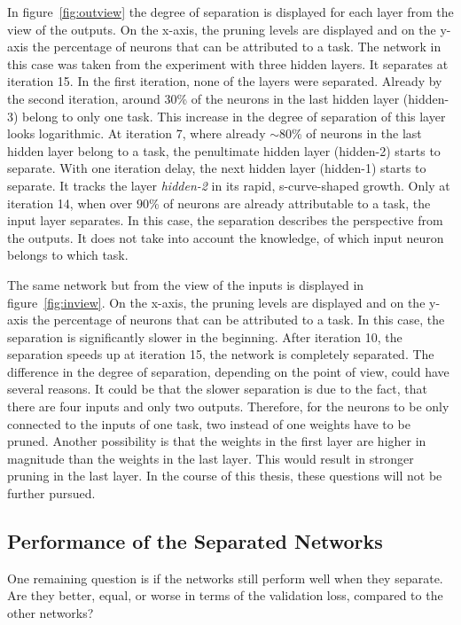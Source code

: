 In figure~\ref{fig:outview} the degree of separation is displayed for each layer from the view of the outputs.
On the x-axis, the pruning levels are displayed and on the y-axis the percentage of neurons that can be attributed to a task.
The network in this case was taken from the experiment with three hidden layers.
It separates at iteration 15.
In the first iteration, none of the layers were separated.
Already by the second iteration, around $30$\% of the neurons in the last hidden layer (hidden-3) belong to only one task.
This increase in the degree of separation of this layer looks logarithmic.
At iteration 7, where already $\sim80$\% of neurons in the last hidden layer belong to a task, the penultimate hidden layer (hidden-2) starts to separate.
With one iteration delay, the next hidden layer (hidden-1) starts to separate.
It tracks the layer \textit{hidden-2} in its rapid, s-curve-shaped growth.
Only at iteration 14, when over $90$\% of neurons are already attributable to a task, the input layer separates.
In this case, the separation describes the perspective from the outputs.
It does not take into account the knowledge, of which input neuron belongs to which task.

The same network but from the view of the inputs is displayed in figure~\ref{fig:inview}.
On the x-axis, the pruning levels are displayed and on the y-axis the percentage of neurons that can be attributed to a task.
In this case, the separation is significantly slower in the beginning.
After iteration 10, the separation speeds up at iteration 15, the network is completely separated.
The difference in the degree of separation, depending on the point of view, could have several reasons.
It could be that the slower separation is due to the fact, that there are four inputs and only two outputs.
Therefore, for the neurons to be only connected to the inputs of one task, two instead of one weights have to be pruned.
Another possibility is that the weights in the first layer are higher in magnitude than the weights in the last layer.
This would result in stronger pruning in the last layer.
In the course of this thesis, these questions will not be further pursued.

\subsection{Performance of the Separated Networks}
One remaining question is if the networks still perform well when they separate.
Are they better, equal, or worse in terms of the validation loss, compared to the other networks?

